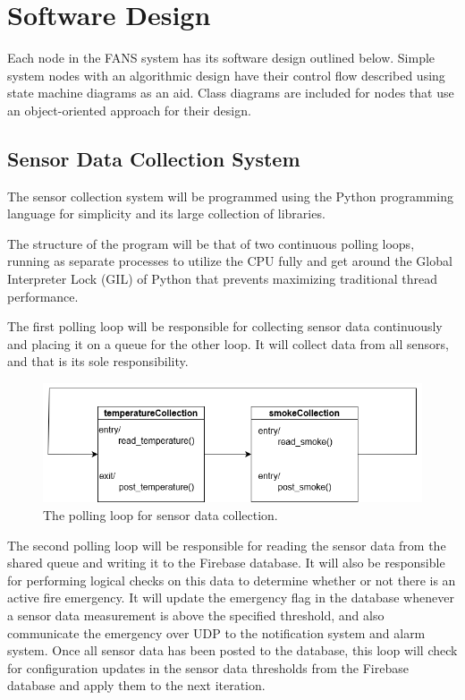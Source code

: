 \section{Software Design}

Each node in the FANS system has its software design outlined below. Simple system nodes with an algorithmic design
have their control flow described using state machine diagrams as an aid. Class diagrams are included for nodes that
use an object-oriented approach for their design.

\subsection{Sensor Data Collection System}

The sensor collection system will be programmed using the Python programming language for simplicity and its large
collection of libraries.

The structure of the program will be that of two continuous polling loops, running as separate processes to utilize the
CPU fully and get around the Global Interpreter Lock (GIL) of Python that prevents maximizing traditional thread
performance.

The first polling loop will be responsible for collecting sensor data continuously and placing it on a queue for the
other loop. It will collect data from all sensors, and that is its sole responsibility.

\begin{figure}[H]
    \centering
    \includegraphics[width=\linewidth]{../assets/DataCollectionStateMachine.png}
    \caption{The polling loop for sensor data collection.}
\end{figure}

The second polling loop will be responsible for reading the sensor data from the shared queue and writing it to the
Firebase database. It will also be responsible for performing logical checks on this data to determine whether or not
there is an active fire emergency. It will update the emergency flag in the database whenever a sensor data measurement
is above the specified threshold, and also communicate the emergency over UDP to the notification system and alarm
system. Once all sensor data has been posted to the database, this loop will check for configuration updates in the
sensor data thresholds from the Firebase database and apply them to the next iteration.

